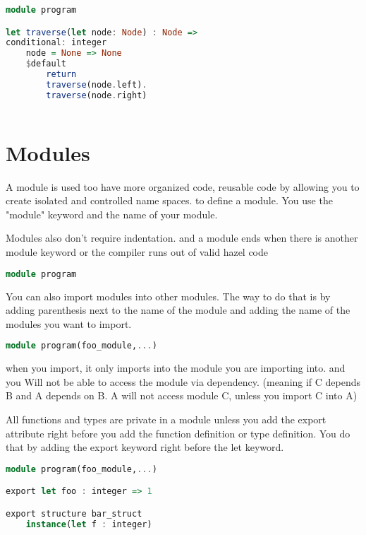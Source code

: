 \documentclass{article}
\begin{document}
\begin{lstlisting}[language=Haskell, caption=Multi-line conditional branches]
module program

let traverse(let node: Node) : Node =>
conditional: integer 
    node = None => None
    $default										   
        return 
        traverse(node.left).
        traverse(node.right)
    
\end{lstlisting}


\section{Modules}
A module is used too have more organized code, reusable code by allowing you to create isolated and controlled name spaces. 
to define a module. You use the "module" keyword and the name of your module.

Modules also don't require indentation. and a module ends when there is another
module keyword or the compiler runs out of valid hazel code


\begin{lstlisting}[language=Haskell, caption=How to define a module]
module program
\end{lstlisting}

You can also import modules into other modules. The way to do that is by adding parenthesis next to the name of the module
and adding the name of the modules you want to import. 
\begin{lstlisting}[language=Haskell, caption=How to import Other modules]
module program(foo_module,...)
\end{lstlisting}

when you import, it only imports into the module you are importing into. and you Will not be able to access the module via dependency. 
(meaning if C depends B and A depends on B. A will not access module C, unless you import C into A) 

All functions and types are private in a
module unless you add the export attribute right before you add the function definition or type definition.
You do that by adding the export keyword right before the let keyword. 

\begin{lstlisting}[language=Haskell, caption=exporting]
module program(foo_module,...)

export let foo : integer => 1

export structure bar_struct
    instance(let f : integer)
\end{lstlisting}
\end{document}
